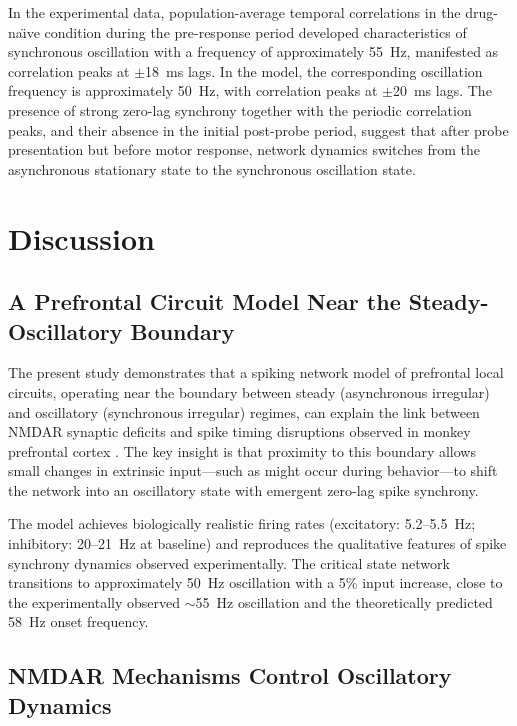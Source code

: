 \documentclass[10pt]{article}
\begin{document}
In the experimental data, population-average temporal correlations in the drug-na\"{\i}ve condition during the pre-response period developed characteristics of synchronous oscillation with a frequency of approximately 55~Hz, manifested as correlation peaks at $\pm$18~ms lags. In the model, the corresponding oscillation frequency is approximately 50~Hz, with correlation peaks at $\pm$20~ms lags. The presence of strong zero-lag synchrony together with the periodic correlation peaks, and their absence in the initial post-probe period, suggest that after probe presentation but before motor response, network dynamics switches from the asynchronous stationary state to the synchronous oscillation state.

\section{Discussion}

\subsection{A Prefrontal Circuit Model Near the Steady-Oscillatory Boundary}

The present study demonstrates that a spiking network model of prefrontal local circuits, operating near the boundary between steady (asynchronous irregular) and oscillatory (synchronous irregular) regimes, can explain the link between NMDAR synaptic deficits and spike timing disruptions observed in monkey prefrontal cortex \citep{zick2018blocking}. The key insight is that proximity to this boundary allows small changes in extrinsic input---such as might occur during behavior---to shift the network into an oscillatory state with emergent zero-lag spike synchrony.

The model achieves biologically realistic firing rates (excitatory: 5.2--5.5~Hz; inhibitory: 20--21~Hz at baseline) and reproduces the qualitative features of spike synchrony dynamics observed experimentally. The critical state network transitions to approximately 50~Hz oscillation with a 5\% input increase, close to the experimentally observed $\sim$55~Hz oscillation and the theoretically predicted 58~Hz onset frequency.

\subsection{NMDAR Mechanisms Control Oscillatory Dynamics}
\end{document}
